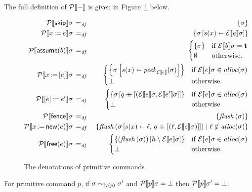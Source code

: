 \documentclass[11pt]{report}
\begin{document}
The full definition of $\mathcal{P}[\![-]\!]$ is given in Figure~\ref{fig:dnpcomm} below. 

\begin{figure}[h]
	\centering
		\begin{eqnarray*}
			\dnpcomm{\cskip}\sigma & \eqdef & \set{\sigma} \\
			\dnpcomm{\cassign{x}{e}}\sigma & \eqdef & \set{\recup{\sigma}{s(x)}{\dnexpr{e}\sigma}}\\ 
			\dnpcomm{\cassume{b}}\sigma & \eqdef & \begin{cases}
				\set{\sigma} & \text{if $\dnexpr{b}\sigma = \bvt$} \\
				\emptyset & \text{otherwise.}
			\end{cases} \\
			\dnpcomm{\cload{x}{e}}\sigma & \eqdef & \begin{cases}	\set{\recup{\sigma}{s(x)}{\speek{\dnexpr{e}}{\sigma}}} & \text{if $\dnexpr{e}\sigma \in \alloc{\sigma}$} \\ 
			\bot & \text{otherwise.}
			\end{cases} \\
			\dnpcomm{\cstore{e}{e'}}\sigma & \eqdef & \begin{cases} 	\set{\funup{\sigma}{\ptapp{q}{\lsingle{(\dnexpr{e}\sigma, \dnexpr{e'}\sigma}}}} & \text{if $\dnexpr{e}\sigma \in \alloc{\sigma}$} \\	
			\bot & \text{otherwise.}
			\end{cases}  \\
			\dnpcomm{\cfence}\sigma & \eqdef & \set{\sflush{\sigma}} \\
			\dnpcomm{\cnew{x}{e}}\sigma & \eqdef & \setof{\sflush{\funup{\sigma}{\ptup{s(x)}{\ell},\,\ptapp{q}{\lsingle{(\ell,\dnexpr{e}\sigma)}}}}}{\ell \notin \alloc{\sigma}}\\
			\dnpcomm{\cfree{e}}\sigma & \eqdef & \begin{cases}	\set{\funup{(\sflush{\sigma})}{h \setminus \dnexpr{e}\sigma}} & \text{if $\dnexpr{e}\sigma \in \alloc{\sigma}$} \\
			\bot & \text{otherwise.}
			\end{cases}
		\end{eqnarray*}
	\caption{The denotations of primitive commands}
	\label{fig:dnpcomm}
\end{figure}

\begin{lemma}
	\label{lem:pcomm-fv-abort}
	For primitive command $p$, if $\sigma \sim_{\mathrm{fv}(p)} \sigma'$ and $\mathcal{P}[\![p]\!]\sigma = \bot$ then $\mathcal{P}[\![p]\!]\sigma' = \bot$. 
\end{lemma}
\end{document}
